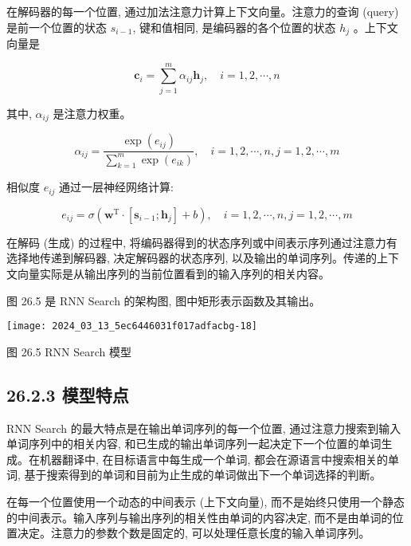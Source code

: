 \documentclass[10pt]{article}
\begin{document}
在解码器的每一个位置, 通过加法注意力计算上下文向量。注意力的查询 (query) 是前一个位置的状态 $s_{i-1}$, 键和值相同, 是编码器的各个位置的状态 $h_{j}$ 。上下文向量是


\begin{equation*}
\boldsymbol{c}_{i}=\sum_{j=1}^{m} \alpha_{i j} \boldsymbol{h}_{j}, \quad i=1,2, \cdots, n \tag{26.18}
\end{equation*}


其中, $\alpha_{i j}$ 是注意力权重。


\begin{equation*}
\alpha_{i j}=\frac{\exp \left(e_{i j}\right)}{\sum_{k=1}^{m} \exp \left(e_{i k}\right)}, \quad i=1,2, \cdots, n, j=1,2, \cdots, m \tag{26.19}
\end{equation*}


相似度 $e_{i j}$ 通过一层神经网络计算:


\begin{equation*}
e_{i j}=\sigma\left(\boldsymbol{w}^{\mathrm{T}} \cdot\left[\boldsymbol{s}_{i-1} ; \boldsymbol{h}_{j}\right]+b\right), \quad i=1,2, \cdots, n, j=1,2, \cdots, m \tag{26.20}
\end{equation*}


在解码 (生成) 的过程中, 将编码器得到的状态序列或中间表示序列通过注意力有选择地传递到解码器, 决定解码器的状态序列, 以及输出的单词序列。传递的上下文向量实际是从输出序列的当前位置看到的输入序列的相关内容。

图 26.5 是 RNN Search 的架构图, 图中矩形表示函数及其输出。

\begin{center}
\texttt{[image: 2024\_03\_13\_5ec6446031f017adfacbg-18]}
\end{center}

图 26.5 RNN Search 模型

\subsection*{26.2.3 模型特点}
RNN Search 的最大特点是在输出单词序列的每一个位置, 通过注意力搜索到输入单词序列中的相关内容, 和已生成的输出单词序列一起决定下一个位置的单词生成。在机器翻译中, 在目标语言中每生成一个单词, 都会在源语言中搜索相关的单词, 基于搜索得到的单词和目前为止生成的单词做出下一个单词选择的判断。

在每一个位置使用一个动态的中间表示 (上下文向量), 而不是始终只使用一个静态的中间表示。输入序列与输出序列的相关性由单词的内容决定, 而不是由单词的位置决定。注意力的参数个数是固定的, 可以处理任意长度的输入单词序列。
\end{document}
